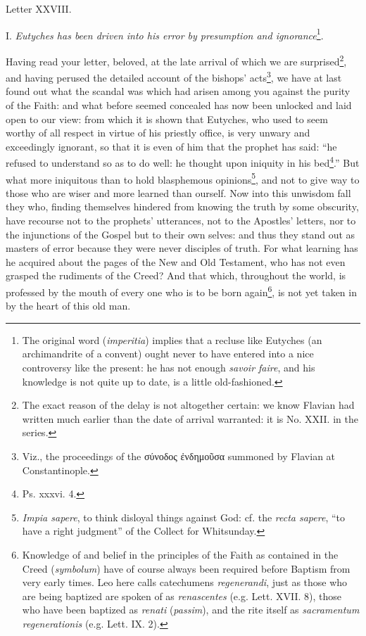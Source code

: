 
Letter XXVIII.

I. \emph{Eutyches has been driven into his error by presumption and ignorance}\footnote{The original word (\emph{imperitia}) implies that a recluse like Eutyches (an archimandrite of a convent) ought never to have entered into a nice controversy like the present: he has not enough \emph{savoir faire}, and his knowledge is not quite up to date, is a little old-fashioned.}.

Having read your letter, beloved, at the late arrival of which we are surprised\footnote{The exact reason of the delay is not altogether certain: we know Flavian had written much earlier than the date of arrival warranted: it is No. XXII. in the series.}, and having perused the detailed account of the bishops’ acts\footnote{Viz., the proceedings of the \textgreek{σύνοδος ἐνδημοῦσα} summoned by Flavian at Constantinople.}, we have at last found out what the scandal was which had arisen among you against the purity of the Faith: and what before seemed concealed has now been unlocked and laid open to our view: from which it is shown that Eutyches, who used to seem worthy of all respect in virtue of his priestly office, is very unwary and exceedingly ignorant, so that it is even of him that the prophet has said: “he refused to understand so as to do well: he thought upon iniquity in his bed\footnote{Ps. xxxvi. 4.}.” But what more iniquitous than to hold blasphemous opinions\footnote{\emph{Impia sapere}, to think disloyal things against God: cf. the \emph{recta sapere}, “to have a right judgment” of the Collect for Whitsunday.}, and not to give way to those who are wiser and more learned than ourself. Now into this unwisdom fall they who, finding themselves hindered from knowing the truth by some obscurity, have recourse not to the prophets’ utterances, not to the Apostles’ letters, nor to the injunctions of the Gospel but to their own selves: and thus they stand out as masters of error because they were never disciples of truth. For what learning has he acquired about the pages of the New and Old Testament, who has not even grasped the rudiments of the Creed? And that which, throughout the world, is professed by the mouth of every one who is to be born again\footnote{Knowledge of and belief in the principles of the Faith as contained in the Creed (\emph{symbolum}) have of course always been required before Baptism from very early times. Leo here calls catechumens \emph{regenerandi}, just as those who are being baptized are spoken of as \emph{renascentes} (e.g. Lett. XVII. 8), those who have been baptized as \emph{renati} (\emph{passim}), and the rite itself as \emph{sacramentum regenerationis} (e.g. Lett. IX. 2).}, is not yet taken in by the heart of this old man.

